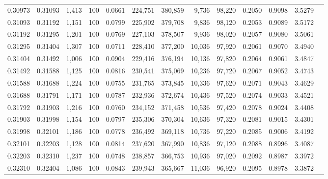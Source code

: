 \begin{tabular}{rrrrrrrrrrrrr}
0.30973 & 0.31093 & 1,413 & 100 &                                     0.0661 & 224,751 & 380,859 &   9,736 &  98,220 & 0.2050 & 0.9098 & 3.5279 \\
0.31093 & 0.31192 & 1,151 & 100 &                                     0.0799 & 225,902 & 379,708 &   9,836 &  98,120 & 0.2053 & 0.9089 & 3.5172 \\
0.31192 & 0.31295 & 1,201 & 100 &                                     0.0769 & 227,103 & 378,507 &   9,936 &  98,020 & 0.2057 & 0.9080 & 3.5061 \\
0.31295 & 0.31404 & 1,307 & 100 &                                     0.0711 & 228,410 & 377,200 &  10,036 &  97,920 & 0.2061 & 0.9070 & 3.4940 \\
0.31404 & 0.31492 & 1,006 & 100 &                                     0.0904 & 229,416 & 376,194 &  10,136 &  97,820 & 0.2064 & 0.9061 & 3.4847 \\
0.31492 & 0.31588 & 1,125 & 100 &                                     0.0816 & 230,541 & 375,069 &  10,236 &  97,720 & 0.2067 & 0.9052 & 3.4743 \\
0.31588 & 0.31688 & 1,224 & 100 &                                     0.0755 & 231,765 & 373,845 &  10,336 &  97,620 & 0.2071 & 0.9043 & 3.4629 \\
0.31688 & 0.31791 & 1,171 & 100 &                                     0.0787 & 232,936 & 372,674 &  10,436 &  97,520 & 0.2074 & 0.9033 & 3.4521 \\
0.31792 & 0.31903 & 1,216 & 100 &                                     0.0760 & 234,152 & 371,458 &  10,536 &  97,420 & 0.2078 & 0.9024 & 3.4408 \\
0.31903 & 0.31998 & 1,154 & 100 &                                     0.0797 & 235,306 & 370,304 &  10,636 &  97,320 & 0.2081 & 0.9015 & 3.4301 \\
0.31998 & 0.32101 & 1,186 & 100 &                                     0.0778 & 236,492 & 369,118 &  10,736 &  97,220 & 0.2085 & 0.9006 & 3.4192 \\
0.32101 & 0.32203 & 1,128 & 100 &                                     0.0814 & 237,620 & 367,990 &  10,836 &  97,120 & 0.2088 & 0.8996 & 3.4087 \\
0.32203 & 0.32310 & 1,237 & 100 &                                     0.0748 & 238,857 & 366,753 &  10,936 &  97,020 & 0.2092 & 0.8987 & 3.3972 \\
0.32310 & 0.32404 & 1,086 & 100 &                                     0.0843 & 239,943 & 365,667 &  11,036 &  96,920 & 0.2095 & 0.8978 & 3.3872 \\

\end{tabular}
